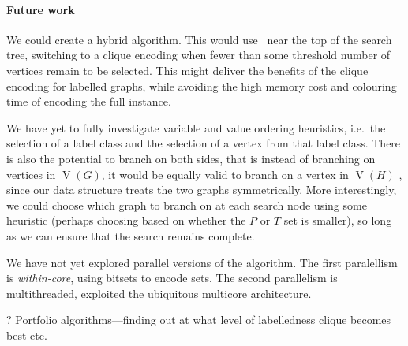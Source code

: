 \documentclass[letterpaper]{article}
\newcommand{\McSplit}{\textproc{McSplit}}
\DeclareMathOperator{\V}{V}
\begin{document}
\paragraph{Future work} We could create a hybrid algorithm. This would use \McSplit\ near the top of the search tree, switching to a
clique encoding when fewer than some threshold number of vertices remain to be
selected. This might deliver the benefits of the clique encoding for
labelled graphs, while avoiding the high memory cost and colouring time of
encoding the full instance.

We have yet to fully investigate variable and value ordering heuristics, i.e.\ the selection of a label class and the selection of a vertex from that label class.
There is also the potential to branch on both sides, that is instead of branching on vertices in $\V(G)$, it would be equally valid to branch on
a vertex in $\V(H)$ , since our data structure treats the
two graphs symmetrically. More interestingly, we could choose which graph to branch on
at each search node using some heuristic (perhaps choosing based on whether the $P$ or
$T$ set is smaller), so long as we can ensure that the search remains complete.

We have not yet explored parallel versions of the algorithm. The first paralellism is \emph{within-core}, using bitsets to encode sets. The second parallelism  is  multithreaded,
exploited the ubiquitous multicore architecture.

? Portfolio algorithms---finding out at what level of labelledness clique becomes best etc.




\end{document}
